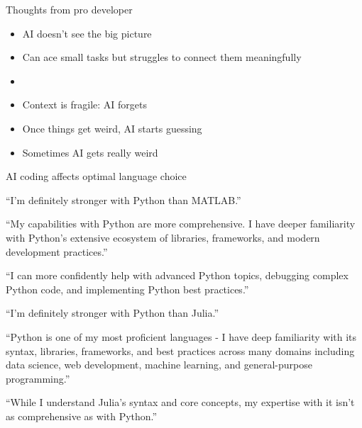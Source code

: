\begin{frame}

    Thoughts from pro developer 

    \begin{itemize}
        \item AI doesn't see the big picture
        \vspace{0.5em}
        \item Can ace small tasks but struggles to connect them meaningfully
        \vspace{0.5em}
        \item {}
        \vspace{0.5em}
        \item Context is fragile: AI forgets
        \vspace{0.5em}
        \item Once things get weird, AI starts guessing
        \vspace{0.5em}
        \item Sometimes AI gets really weird
    \end{itemize}

\end{frame}


\begin{frame}{AI coding affects optimal language choice}
    
    ``I'm definitely stronger with Python than MATLAB.''

    \vspace{0.5em}
    \vspace{0.5em}
    ``My capabilities with Python
    are more comprehensive. I have deeper familiarity with Python's extensive
    ecosystem of libraries, frameworks, and modern development practices.''


    \vspace{0.5em}
    \vspace{0.5em}
    ``I can
    more confidently help with advanced Python topics, debugging complex Python
    code, and implementing Python best practices.''

\end{frame}

\begin{frame}
    
    ``I'm definitely stronger with Python than Julia.''

    \vspace{0.5em}
    \vspace{0.5em}
    ``Python is one of my most proficient languages - I have deep familiarity with
    its syntax, libraries, frameworks, and best practices across many domains
    including data science, web development, machine learning, and
    general-purpose programming.''

    \vspace{0.5em}
    \vspace{0.5em}
    ``While I understand Julia's syntax and core concepts, my expertise with it
    isn't as comprehensive as with Python.''

\end{frame}

